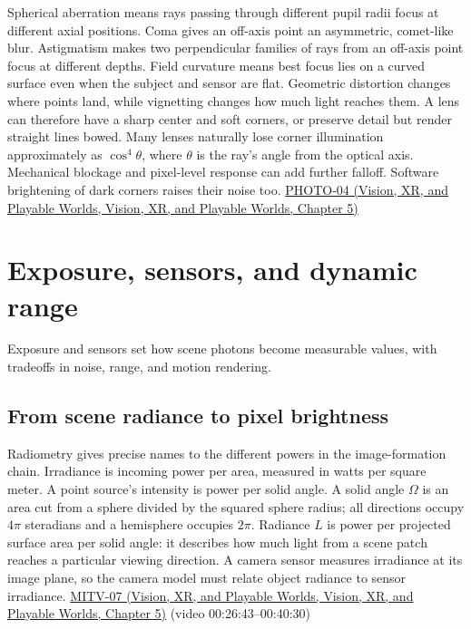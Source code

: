 Spherical aberration means rays passing through different pupil radii focus at different axial positions. Coma gives an off-axis point an asymmetric, comet-like blur. Astigmatism makes two perpendicular families of rays from an off-axis point focus at different depths. Field curvature means best focus lies on a curved surface even when the subject and sensor are flat. Geometric distortion changes where points land, while vignetting changes how much light reaches them. A lens can therefore have a sharp center and soft corners, or preserve detail but render straight lines bowed. Many lenses naturally lose corner illumination approximately as \(\cos^4\theta\), where \(\theta\) is the ray's angle from the optical axis. Mechanical blockage and pixel-level response can add further falloff. Software brightening of dark corners raises their noise too. \href{../07-Vision-XR-and-Playable-Worlds/main.pdf\#nameddest=04-visual-computing-ii-ch036-photo-04---photography-session-04}{PHOTO-04 (Vision, XR, and Playable Worlds, Vision, XR, and Playable Worlds, Chapter 5)}

\section{Exposure, sensors, and dynamic range}\label{03-visual-computing-i-ch003-exposure-sensors-and-dynamic-range}

Exposure and sensors set how scene photons become measurable values, with tradeoffs in noise, range, and motion rendering.

\subsection{From scene radiance to pixel brightness}\label{03-visual-computing-i-ch003-from-scene-radiance-to-pixel-brightness}

Radiometry gives precise names to the different powers in the image-formation chain. Irradiance is incoming power per area, measured in watts per square meter. A point source's intensity is power per solid angle. A solid angle \(\Omega\) is an area cut from a sphere divided by the squared sphere radius; all directions occupy \(4\pi\) steradians and a hemisphere occupies \(2\pi\). Radiance \(L\) is power per projected surface area per solid angle: it describes how much light from a scene patch reaches a particular viewing direction. A camera sensor measures irradiance at its image plane, so the camera model must relate object radiance to sensor irradiance. \href{../07-Vision-XR-and-Playable-Worlds/main.pdf\#nameddest=04-visual-computing-ii-ch036-mitv-07---gradient-space-reflectance-map-image-irradiance-equation-gnomonic-projection}{MITV-07 (Vision, XR, and Playable Worlds, Vision, XR, and Playable Worlds, Chapter 5)} (video 00:26:43--00:40:30)

